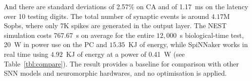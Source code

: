 \documentclass{frontiersENG} %
\begin{document}
And there are standard deviations of 2.57\% on CA and of 1.17~ms on the latency over 10 testing digits.
The total number of synaptic events is around $4.17$M Sopbs, where only 7K spikes are generated in the output layer. 
The NEST simulation costs 767.67~s on average for the entire $12,000$~s biological-time test, 20~W in power use on the PC and $15.35$~KJ of energy, while SpiNNaker works in real time using $4.92$~KJ of energy at a power of 0.41~W (see Table~\ref{tbl:compare}).
The result provides a baseline for comparison with other SNN models and neuromorphic hardwares, and no optimisation is applied.
\end{document}
